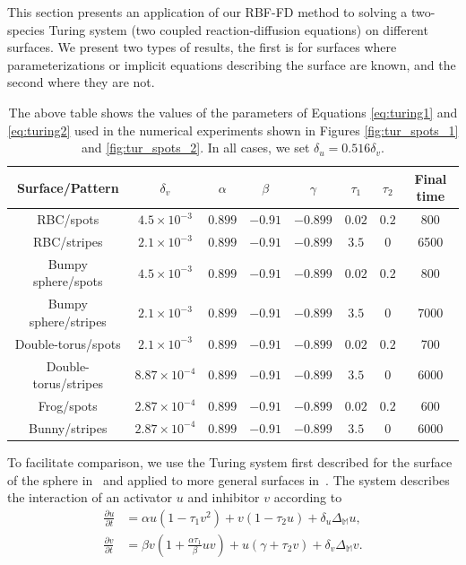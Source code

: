 \documentclass[smallextended]{svjour3}
\newcommand{\lf}{\left}
\newcommand{\rt}{\right}
\begin{document}
This section presents an application of our RBF-FD method to solving a two-species Turing system (two coupled reaction-diffusion equations) on different surfaces. We present two types of results, the first is for surfaces where parameterizations or implicit equations describing the surface are known, and the second where they are not.
%
\begin{table}[ht]
\centering
\begin{tabular}{|c|c|c|c|c|c|c|c|}
\hline
\textbf{Surface/Pattern} & $\delta_v$ & $\alpha$ & $\beta$ & $\gamma$ & $\tau_1$ & $\tau_2$ & Final time \\ \toprule \hline
RBC/spots & $4.5 \times 10^{-3}$ & $0.899$ & $-0.91$ & $-0.899$ & $0.02$ & $0.2$ & 800 \\\hline
RBC/stripes & $2.1 \times 10^{-3}$ & $0.899$ & $-0.91$ & $-0.899$ & $3.5$ & $0$ & 6500\\\hline
Bumpy sphere/spots & $4.5 \times 10^{-3}$ & $0.899$ & $-0.91$ & $-0.899$ & $0.02$ & $0.2$ & 800 \\\hline
Bumpy sphere/stripes & $2.1 \times 10^{-3}$ & $0.899$ & $-0.91$ & $-0.899$ & $3.5$ & $0$ & 7000 \\\hline
Double-torus/spots & $2.1 \times 10^{-3}$ & $0.899$ & $-0.91$ & $-0.899$ & $0.02$ & $0.2$ & 700 \\\hline
Double-torus/stripes & $8.87 \times 10^{-4}$ & $0.899$ & $-0.91$ & $-0.899$ & $3.5$ & $0$ & 6000\\\hline
Frog/spots & $2.87 \times 10^{-4}$ & $0.899$ & $-0.91$ & $-0.899$ & $0.02$ & $0.2$ & 600\\\hline
Bunny/stripes & $2.87 \times 10^{-4}$& $0.899$ & $-0.91$ & $-0.899$ & $3.5$ & $0$ & 6000 \\\hline
\end{tabular}
\caption{The above table shows the values of the parameters of Equations \eqref{eq:turing1} and \eqref{eq:turing2} used in the numerical experiments shown in Figures \ref{fig:tur_spots_1} and \ref{fig:tur_spots_2}. In all cases, we set $\delta_u = 0.516 \delta_v$.}
\label{tab:tur_param}
\end{table}
%
To facilitate comparison, we use the Turing system first described for the surface of the sphere in~\cite{VareaEtAl1999} and applied to more general surfaces in~\cite{FuselierWright2012}. The system describes the interaction of an activator $u$ and inhibitor $v$ according to
%
\begin{align}
\frac{\partial u}{\partial t} &=  \alpha u(1- \tau_1 v^2) + v(1 - \tau_2 u) + \delta_u\Delta_{\mathbb{M}} u, \label{eq:turing1} \\ 
\frac{\partial v}{\partial t} &= \beta v \lf(1 + \frac{\alpha \tau_1}{\beta} uv \rt) + u(\gamma + \tau_2v) + \delta_v \Delta_{\mathbb{M}} v. \label{eq:turing2}
\end{align}
\end{document}
